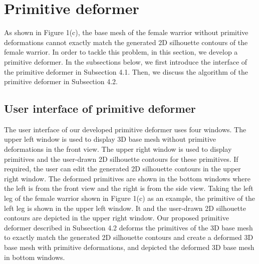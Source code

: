 \documentclass[10pt,twocolumn,letterpaper]{article}
\begin{document}
\section{Primitive deformer}
As shown in Figure 1(c), the base mesh of the female warrior without primitive deformations cannot exactly match the generated 2D silhouette contours of the female warrior. In order to tackle this problem, in this section, we develop a primitive deformer. In the subsections below, we first introduce the interface of the primitive deformer in Subsection 4.1. Then, we discuss the algorithm of the primitive deformer in Subsection 4.2.
\subsection{User interface of primitive deformer}
The user interface of our developed primitive deformer uses four windows. The upper left window is used to display 3D base mesh without primitive deformations in the front view. The upper right window is used to display primitives and the user-drawn 2D silhouette contours for these primitives. If required, the user can edit the generated 2D silhouette contours in the upper right window. The deformed primitives are shown in the bottom windows where the left is from the front view and the right is from the side view. 
Taking the left leg of the female warrior shown in Figure 1(c) as an example, the primitive of the left leg is shown in the upper left window. It and the user-drawn 2D silhouette contours are depicted in the upper right window. Our proposed primitive deformer described in Subsection 4.2 deforms the primitives of the 3D base mesh to exactly match the generated 2D silhouette contours and create a deformed 3D base mesh with primitive deformations, and depicted the deformed 3D base mesh in bottom windows. 
\end{document}
